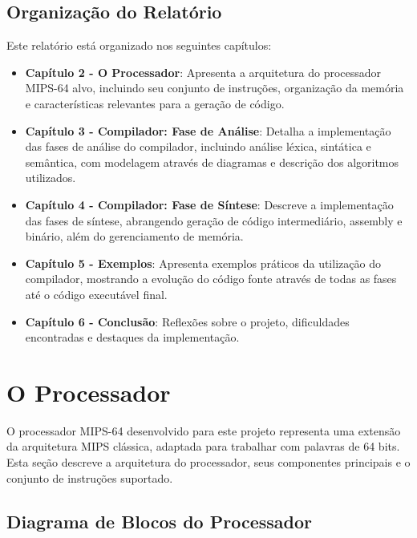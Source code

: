 \documentclass[
	12pt,				%
	oneside,
	a4paper,			%
	english,			%
	french,				%
	spanish,			%
	brazil,				%
	]{abntex2}
\begin{document}
\section{Organização do Relatório}

Este relatório está organizado nos seguintes capítulos:

\begin{itemize}
    \item \textbf{Capítulo 2 - O Processador}: Apresenta a arquitetura do processador MIPS-64 alvo, incluindo seu conjunto de instruções, organização da memória e características relevantes para a geração de código.
    
    \item \textbf{Capítulo 3 - Compilador: Fase de Análise}: Detalha a implementação das fases de análise do compilador, incluindo análise léxica, sintática e semântica, com modelagem através de diagramas e descrição dos algoritmos utilizados.
    
    \item \textbf{Capítulo 4 - Compilador: Fase de Síntese}: Descreve a implementação das fases de síntese, abrangendo geração de código intermediário, assembly e binário, além do gerenciamento de memória.
    
    \item \textbf{Capítulo 5 - Exemplos}: Apresenta exemplos práticos da utilização do compilador, mostrando a evolução do código fonte através de todas as fases até o código executável final.
    
    \item \textbf{Capítulo 6 - Conclusão}: Reflexões sobre o projeto, dificuldades encontradas e destaques da implementação.
\end{itemize}

\chapter{O Processador}

O processador MIPS-64 desenvolvido para este projeto representa uma extensão da arquitetura MIPS clássica, adaptada para trabalhar com palavras de 64 bits. Esta seção descreve a arquitetura do processador, seus componentes principais e o conjunto de instruções suportado.

\section{Diagrama de Blocos do Processador}
\end{document}
